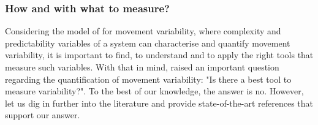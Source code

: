 \subsubsection{How and with what to measure?}

Considering the model of \cite{stergiou2006} for movement variability,
where complexity and predictability variables of a system can 
characterise and quantify movement variability, it is important to 
find, to understand and to apply the right tools that measure such variables.
With that in mind, \cite[p. 67]{caballero2014} raised an important question regarding the quantification 
of movement variability: "Is there a best tool to measure variability?".
To the best of our knowledge, the answer is no. However, let us dig in further into the 
literature and provide state-of-the-art references that support our answer.



